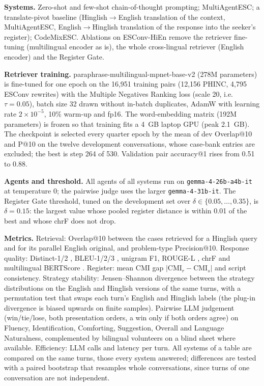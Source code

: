 \documentclass[conference]{IEEEtran}
\newcommand{\cmi}{\mathrm{CMI}}
\begin{document}
\noindent\textbf{Systems.} Zero-shot and few-shot chain-of-thought prompting; MultiAgentESC; a
translate-pivot baseline (Hinglish$\rightarrow$English translation of the context, MultiAgentESC,
English$\rightarrow$Hinglish translation of the response into the seeker's register); CodeMixESC.
Ablations on ESConv-HiEn remove the retriever fine-tuning (multilingual encoder as is), the whole
cross-lingual retriever (English encoder) and the Register Gate.

\noindent\textbf{Retriever training.} paraphrase-multilingual-mpnet-base-v2 (278M parameters) is
fine-tuned for one epoch on the 16,951 training pairs (12,156 PHINC, 4,795 ESConv rewrites) with the
Multiple Negatives Ranking loss (scale 20, i.e.\ $\tau=0.05$), batch size 32 drawn without in-batch
duplicates, AdamW with learning rate $2\times10^{-5}$, 10\% warm-up and fp16. The word-embedding
matrix (192M parameters) is frozen so that training fits a 4~GB laptop GPU (peak 2.1~GB). The
checkpoint is selected every quarter epoch by the mean of dev Overlap@10 and P@10 on the twelve
development conversations, whose case-bank entries are excluded; the best is step 264 of 530.
Validation pair accuracy@1 rises from 0.51 to 0.88.

\noindent\textbf{Agents and threshold.} All agents of all systems run on \texttt{gemma-4-26b-a4b-it}
at temperature 0; the pairwise judge uses the larger \texttt{gemma-4-31b-it}. The Register Gate
threshold, tuned on the development set over $\delta\in\{0.05,\dots,0.35\}$, is $\delta=0.15$: the
largest value whose pooled register distance is within 0.01 of the best and whose chrF does not drop.

\noindent\textbf{Metrics.} Retrieval: Overlap@10 between the cases retrieved for a Hinglish query
and for its parallel English original, and problem-type Precision@10. Response quality:
Distinct-1/2 \cite{li2016diversity}, BLEU-1/2/3 \cite{papineni2002bleu}, unigram F1, ROUGE-L
\cite{lin2004rouge}, chrF \cite{popovic2015chrf} and multilingual BERTScore
\cite{zhang2020bertscore}. Register: mean CMI gap $|\cmi_r-\cmi_s|$ and script consistency.
Strategy stability: Jensen--Shannon divergence \cite{lin1991divergence} between the strategy
distributions on the English and Hinglish versions of the same turns, with a permutation test
that swaps each turn's English and Hinglish labels (the plug-in divergence is biased upwards on
finite samples). Pairwise LLM judgement (win/tie/lose, both presentation orders, a win only if
both orders agree) on Fluency, Identification, Comforting, Suggestion, Overall and Language
Naturalness, complemented by bilingual volunteers on a blind sheet where available.
Efficiency: LLM calls and latency per turn. All systems of a table are compared on the same
turns, those every system answered; differences are tested with a paired bootstrap that
resamples whole conversations, since turns of one conversation are not independent.
\end{document}
